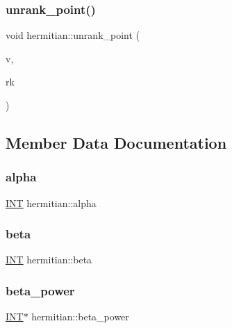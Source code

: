 \subsubsection{\texorpdfstring{unrank\+\_\+point()}{unrank\_point()}}
{\footnotesize\ttfamily void hermitian\+::unrank\+\_\+point (\begin{DoxyParamCaption}\item[{\mbox{\hyperlink{galois_8h_a09fddde158a3a20bd2dcadb609de11dc}{I\+NT}} $\ast$}]{v,  }\item[{\mbox{\hyperlink{galois_8h_a09fddde158a3a20bd2dcadb609de11dc}{I\+NT}}}]{rk }\end{DoxyParamCaption})}



\subsection{Member Data Documentation}
\mbox{\label{classhermitian_a45b8edf4b4ba929820cd08ec0cfb213e}} 
\subsubsection{\texorpdfstring{alpha}{alpha}}
{\footnotesize\ttfamily \mbox{\hyperlink{galois_8h_a09fddde158a3a20bd2dcadb609de11dc}{I\+NT}} hermitian\+::alpha}

\mbox{\label{classhermitian_a0d85395ac6f6ed31e60e020800b2e4c1}} 
\subsubsection{\texorpdfstring{beta}{beta}}
{\footnotesize\ttfamily \mbox{\hyperlink{galois_8h_a09fddde158a3a20bd2dcadb609de11dc}{I\+NT}} hermitian\+::beta}

\mbox{\label{classhermitian_ae753d004e8eb38698ea3207ec3391c27}} 
\subsubsection{\texorpdfstring{beta\+\_\+power}{beta\_power}}
{\footnotesize\ttfamily \mbox{\hyperlink{galois_8h_a09fddde158a3a20bd2dcadb609de11dc}{I\+NT}}$\ast$ hermitian\+::beta\+\_\+power}

